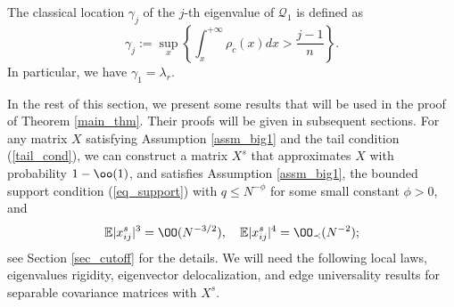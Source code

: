 
\begin{definition} 
The classical location $\gamma_j$ of the $j$-th eigenvalue of $\mathcal Q_1$ is defined as
\begin{equation}\label{gammaj}
\gamma_j:=\sup_{x}\left\{\int_{x}^{+\infty} \rho_{c}(x)dx > \frac{j-1}{n}\right\}.
\end{equation}
In particular, we have $\gamma_1 = \lambda_r$.
\end{definition}

In the rest of this section, we present some results that will be used in the proof of Theorem \ref{main_thm}. Their proofs will be given in subsequent sections. For any matrix $X$ satisfying Assumption \ref{assm_big1} and the tail condition (\ref{tail_cond}), we can construct a matrix $X^s$ that approximates $X$ with probability $1-\oo(1)$, and satisfies Assumption \ref{assm_big1}, the bounded support condition (\ref{eq_support}) with $q\le N^{-\phi}$ for some small constant $\phi>0$, and
\begin{equation}\label{conditionA2}
\mathbb{E}\vert  x^s_{ij} \vert^3 =\OO(N^{-{3}/{2}}), \quad   \mathbb{E} \vert  x^s_{ij} \vert^4  =\OO_\prec (N^{-2});
\end{equation}
see Section \ref{sec_cutoff} for the details. We will need the following local laws, eigenvalues rigidity, eigenvector delocalization, and edge universality results for separable covariance matrices with $X^s$.


